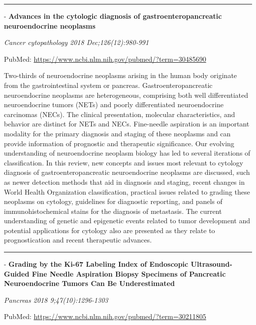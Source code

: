 \documentclass[]{article}
\begin{document}
{}

\begin{center}\rule{0.5\linewidth}{\linethickness}\end{center}

 - \textbf{Advances in the cytologic diagnosis of gastroenteropancreatic
neuroendocrine neoplasms}

\emph{Cancer cytopathology 2018 Dec;126(12):980-991}

PubMed: \url{https://www.ncbi.nlm.nih.gov/pubmed/?term=30485690}

Two-thirds of neuroendocrine neoplasms arising in the human body
originate from the gastrointestinal system or pancreas.
Gastroenteropancreatic neuroendocrine neoplasms are heterogeneous,
comprising both well differentiated neuroendocrine tumors (NETs) and
poorly differentiated neuroendocrine carcinomas (NECs). The clinical
presentation, molecular characteristics, and behavior are distinct for
NETs and NECs. Fine-needle aspiration is an important modality for the
primary diagnosis and staging of these neoplasms and can provide
information of prognostic and therapeutic significance. Our evolving
understanding of neuroendocrine neoplasm biology has led to several
iterations of classification. In this review, new concepts and issues
most relevant to cytology diagnosis of gastroenteropancreatic
neuroendocrine neoplasms are discussed, such as newer detection methods
that aid in diagnosis and staging, recent changes in World Health
Organization classification, practical issues related to grading these
neoplasms on cytology, guidelines for diagnostic reporting, and panels
of immunohistochemical stains for the diagnosis of metastasis. The
current understanding of genetic and epigenetic events related to tumor
development and potential applications for cytology also are presented
as they relate to prognostication and recent therapeutic advances.

{}

{}

\begin{center}\rule{0.5\linewidth}{\linethickness}\end{center}

 - \textbf{Grading by the Ki-67 Labeling Index of Endoscopic
Ultrasound-Guided Fine Needle Aspiration Biopsy Specimens of Pancreatic
Neuroendocrine Tumors Can Be Underestimated}

\emph{Pancreas 2018 9;47(10):1296-1303}

PubMed: \url{https://www.ncbi.nlm.nih.gov/pubmed/?term=30211805}
\end{document}
